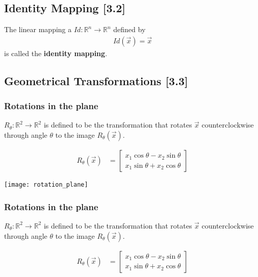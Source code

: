 \documentclass[a4paper,9pt]{extarticle}
\begin{document}
\begin{multicols*}{2}
\subsection{Identity Mapping [3.2]}
The linear mapping a $Id: \mathbb{R}^n \to \mathbb{R}^n$ defined by
\begin{equation} \label{3.2-5}
    \begin{split}
        Id(\vec{x}) = \vec{x}
    \end{split}
\end{equation}
is called the \textbf{identity mapping}.


\subsection{Geometrical Transformations [3.3]}

\subsubsection{Rotations in the plane}
$R_{\theta} : \mathbb{R}^2 \to \mathbb{R}^2$ is defined to be the transformation that rotates $\vec{x}$ counterclockwise through angle $\theta$ to the image $R_{\theta}(\vec{x})$.

\begin{equation} \label{3.3-1}
    \begin{split}
        R_{\theta}(\vec{x}) & = \begin{bmatrix}x_1 \cos{\theta} - x_2 \sin{\theta} \\ x_1 \sin{\theta} + x_2 \cos{\theta}\end{bmatrix}
    \end{split}
\end{equation}

{\centering \texttt{[image: rotation\_plane]} \par}


\subsubsection{Rotations in the plane}
$R_{\theta} : \mathbb{R}^2 \to \mathbb{R}^2$ is defined to be the transformation that rotates $\vec{x}$ counterclockwise through angle $\theta$ to the image $R_{\theta}(\vec{x})$.

\begin{equation} \label{3.3-2}
    \begin{split}
        R_{\theta}(\vec{x}) & = \begin{bmatrix}x_1 \cos{\theta} - x_2 \sin{\theta} \\ x_1 \sin{\theta} + x_2 \cos{\theta}\end{bmatrix}
    \end{split}
\end{equation}


\end{multicols*}
\end{document}
